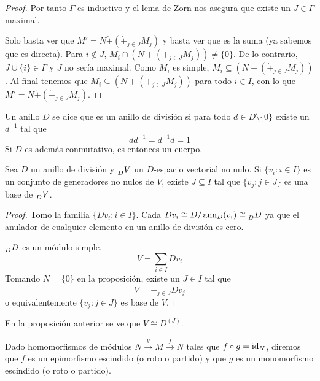 \begin{proof}
  Por tanto \(\Gamma\) es inductivo y el lema de Zorn nos asegura que
  existe un \(J\in\Gamma\) maximal.

  Solo basta ver que \(M'=N\dot{+}\left(\dot{+}_{j\in J}M_j\right)\) y
  basta ver que es la suma (ya sabemos que es directa). Para \(i\notin J\),
  \(M_i\cap\left(N+\left(\dot{+}_{j\in J} M_j\right)\right)\neq \{0\}\).
  De lo contrario, \(J\cup\{i\}\in\Gamma\) y \(J\) no sería maximal.
  Como \(M_i\) es simple, \(M_i\subseteq\left(N+\left(\dot{+}_{j\in J}
  M_j\right)\right)\). Al final tenemos que
  \(M_i\subseteq\left(N+\left(\dot{+}_{j\in J}
  M_j\right)\right)\) para todo \(i\in I\), con lo que
  \(M'=N\dot{+}\left(\dot{+}_{j\in J}M_j\right)\).

\end{proof}

\begin{df}
  Un anillo \(D\) se dice que es un anillo de división si
  para todo \(d\in D\setminus\{0\}\) existe un \(d^{-1}\) tal que
  \[
    dd^{-1}=d^{-1}d=1
  \]
  Si \(D\) es además conmutativo, es entonces un cuerpo.
\end{df}

\begin{cor}
  Sea \(D\) un anillo de división y \(\prescript{}{D}{V}\) un
  \(D\)-espacio vectorial no nulo. Si \(\{v_i:i\in I\}\) es un conjunto
  de generadores no nulos de \(V\), existe \(J\subseteq I\) tal que
  \(\{v_j:j\in J\}\) es una base de \(\prescript{}{D}{V}\).
\end{cor}
\begin{proof}
  Tomo la familia \(\{Dv_i:i\in I\}\). Cada \(Dv_i\cong D/\operatorname{ann}_D (v_i)
  \cong \prescript{}{D}{D}\) ya que el anulador de cualquier elemento
  en un anillo de división es cero.

  \(\prescript{}{D}{D}\) es un módulo simple.
  \[
    V=\sum_{i\in I} Dv_i
  \]
  Tomando \(N=\{0\}\) en la proposición, existe un \(J\in I\) tal que
  \[
    V=\dot{+}_{j\in J} Dv_j
  \]
  o equivalentemente \(\{v_j: j\in J\}\) es base de \(V\).

\end{proof}

\begin{obs}
  En la proposición anterior se ve que \(V\cong D^{(J)}\).
\end{obs}

\begin{df}
  Dado homomorfismos de módulos \(N\overset{g}{\longrightarrow} M
  \overset{f}{\longrightarrow} N\) tales que \(f\circ g=\operatorname{id}_N\), diremos
  que \(f\) es un epimorfismo escindido (o roto o partido)
  y que \(g\) es un monomorfismo escindido (o roto o partido).
\end{df}

